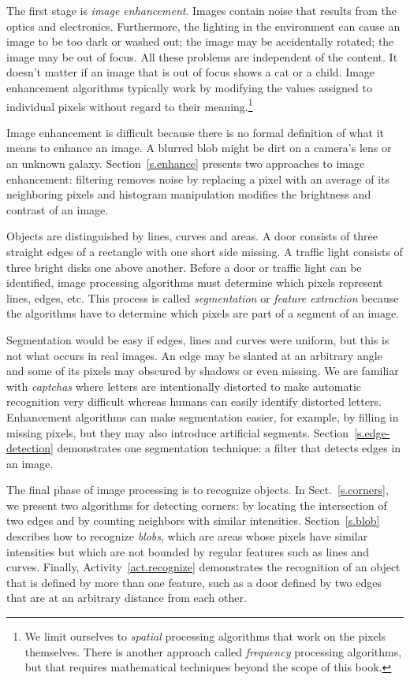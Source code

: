 The first stage is \emph{image enhancement}. Images contain noise that results from the optics and electronics. Furthermore, the lighting in the environment can cause an image to be too dark or washed out; the image may be accidentally rotated; the image may be out of focus. All these problems are independent of the content. It doesn't matter if an image that is out of focus shows a cat or a child. Image enhancement algorithms typically work by modifying the values assigned to individual pixels without regard to their meaning.\footnote{We limit ourselves to \emph{spatial} processing algorithms that work on the pixels themselves. There is another approach called \emph{frequency} processing algorithms, but that requires mathematical techniques beyond the scope of this book.}

Image enhancement is difficult because there is no formal definition of what it means to enhance an image. A blurred blob might be dirt on a camera's lens or an unknown galaxy. Section~\ref{s.enhance} presents two approaches to image enhancement: filtering removes noise by replacing a pixel with an average of its neighboring pixels and histogram manipulation modifies the brightness and contrast of an image.

Objects are distinguished by lines, curves and areas. A door consists of three straight edges of a rectangle with one short side missing. A traffic light consists of three bright disks one above another. Before a door or traffic light can be identified, image processing algorithms must determine which pixels represent lines, edges, etc. This process is called \emph{segmentation} or \emph{feature extraction} because the algorithms have to determine which pixels are part of a segment of an image.

Segmentation would be easy if edges, lines and curves were uniform, but this is not what occurs in real images. An edge may be slanted at an arbitrary angle and some of its pixels may obscured by shadows or even missing. We are familiar with \emph{captchas} where letters are intentionally distorted to make automatic recognition very difficult whereas humans can easily identify distorted letters. Enhancement algorithms can make segmentation easier, for example, by filling in missing pixels, but they may also introduce artificial segments. Section~\ref{s.edge-detection} demonstrates one segmentation technique: a filter that detects edges in an image.

The final phase of image processing is to recognize objects. In Sect.~\ref{s.corners}, we present two algorithms for detecting corners: by locating the intersection of two edges and by counting neighbors with similar intensities. Section~\ref{s.blob} describes how to recognize \emph{blobs}, which are areas whose pixels have similar intensities but which are not bounded by regular features such as lines and curves. Finally, Activity~\ref{act.recognize} demonstrates the recognition of an object that is defined by more than one feature, such as a door defined by two edges that are at an arbitrary distance from each other.

